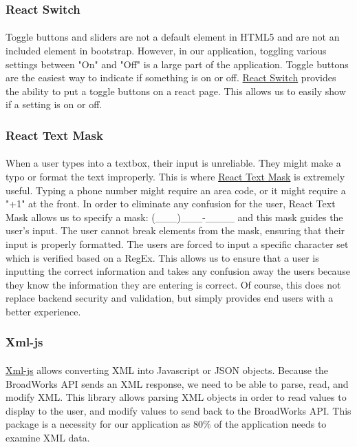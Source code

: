\documentclass[12pt]{article}
\begin{document}
\subsubsection{React Switch}	
\paragraph{}
	Toggle buttons and sliders are not a default element in HTML5 and are not an included element in bootstrap. However, in our application, toggling various settings between "On" and "Off" is a large part of the application. Toggle buttons are the easiest way to indicate if something is on or off. \href{https://www.npmjs.com/package/react-switch}{React Switch} provides the ability to put a toggle buttons on a react page. This allows us to easily show if a setting is on or off.
	
\subsubsection{React Text Mask}	
\paragraph{}
	When a user types into a textbox, their input is unreliable. They might make a typo or format the text improperly. This is where \href{https://www.npmjs.com/package/react-text-mask}{React Text Mask} is extremely useful. Typing a phone number might require an area code, or it might require a "+1" at the front. In order to eliminate any confusion for the user, React Text Mask allows us to specify a mask: (\_\_\_)\_\_\_-\_\_\_\_ and this mask guides the user's input. The user cannot break elements from the mask, ensuring that their input is properly formatted. The users are forced to input a specific character set which is verified based on a RegEx. This allows us to ensure that a user is inputting the correct information and takes any confusion away the users because they know the information they are entering is correct. Of course, this does not replace backend security and validation, but simply provides end users with a better experience.
	
\subsubsection{Xml-js}	
\paragraph{}
	\href{https://www.npmjs.com/package/xml-js}{Xml-js} allows converting XML into Javascript or JSON objects. Because the BroadWorks API sends an XML response, we need to be able to parse, read, and modify XML. This library allows parsing XML objects in order to read values to display to the user, and modify values to send back to the BroadWorks API. This package is a necessity for our application as 80\% of the application needs to examine XML data.
	
\end{document}
